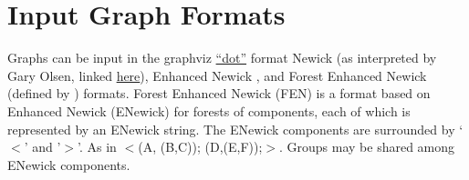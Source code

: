 \documentclass[11pt]{book}
\newcommand{\phyg}{\texttt{PhyG} }
\begin{document}
{{		%
%	
	\section{Input Graph Formats}
	Graphs can be input in the graphviz \href{https://graphviz.org/}{``dot''} format Newick (as 		
	interpreted by Gary Olsen, linked \href{https://evolution.genetics.washington.edu/phylip/newick_doc.html}
	{here}), Enhanced Newick \cite{Cardonaetal2008}, and Forest Enhanced Newick (defined by 
	\citealp{Wheeler2022}) formats.
	Forest Enhanced Newick (FEN) is a format based on Enhanced Newick (ENewick) for 
	forests of components, each of which is represented by an ENewick string. The ENewick 
	components are surrounded by `$<$' and '$>$'. As in $<$(A, (B,C)); (D,(E,F));$>$. 
	Groups may be shared among ENewick components.
	
}}
\end{document}
